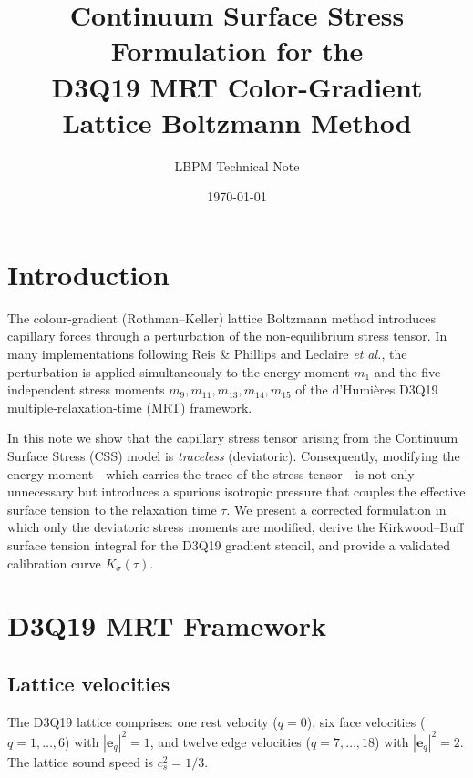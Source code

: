 \documentclass[11pt,a4paper]{article}
\title{Continuum Surface Stress Formulation for the\\
  D3Q19 MRT Color-Gradient Lattice Boltzmann Method}
\author{LBPM Technical Note}
\date{\today}
\newcommand{\vect}[1]{\bm{#1}}
\begin{document}
\maketitle

\section{Introduction}

The colour-gradient (Rothman--Keller) lattice Boltzmann method introduces
capillary forces through a perturbation of the non-equilibrium
stress tensor.  In many implementations following Reis \& Phillips and
Leclaire \textit{et al.}, the perturbation is applied simultaneously to
the energy moment $m_1$ and the five independent stress moments
$m_9,m_{11},m_{13},m_{14},m_{15}$ of the d'Humi\`eres D3Q19
multiple-relaxation-time (MRT) framework.

In this note we show that the capillary stress tensor arising from the
Continuum Surface Stress (CSS) model is \emph{traceless} (deviatoric).
Consequently, modifying the energy moment---which carries the trace of
the stress tensor---is not only unnecessary but introduces a spurious
isotropic pressure that couples the effective surface tension to the
relaxation time $\tau$.  We present a corrected formulation in which
only the deviatoric stress moments are modified, derive the
Kirkwood--Buff surface tension integral for the D3Q19 gradient stencil,
and provide a validated calibration curve $K_\sigma(\tau)$.

\section{D3Q19 MRT Framework}
\label{sec:mrt}

\subsection{Lattice velocities}

The D3Q19 lattice comprises: one rest velocity ($q=0$), six face
velocities ($q=1,\ldots,6$) with $|\vect{e}_q|^2=1$, and twelve edge
velocities ($q=7,\ldots,18$) with $|\vect{e}_q|^2=2$.  The lattice
sound speed is $c_s^2 = 1/3$.
\end{document}
